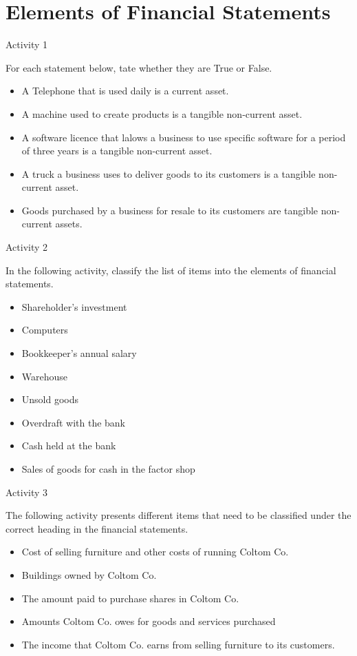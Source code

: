 \section{Elements of Financial Statements} 

Activity 1 

For each statement below, tate whether they are True or False. 

\begin{itemize}
    \item A Telephone that is used daily is a current asset.
    \item A machine used to create products is a tangible non-current asset. 
    \item A software licence that lalows a business to use specific software for a period of three years is a tangible non-current asset. 
    \item A truck a business uses to deliver goods to its customers is a tangible non-current asset. 
    \item Goods purchased by a business for resale to its customers are tangible non-current assets. 
\end{itemize}       

Activity 2 

In the following activity, classify the list of items into the elements of financial statements. 

\begin{itemize} 
    \item Shareholder's investment
    \item Computers 
    \item Bookkeeper's annual salary
    \item Warehouse 
    \item Unsold goods
    \item Overdraft with the bank
    \item Cash held at the bank
    \item Sales of goods for cash in the factor shop
\end{itemize} 

Activity 3 

The following activity presents different items that need to be classified under the correct heading in the financial statements. 

\begin{itemize} 
    \item Cost of selling furniture and other costs of running Coltom Co. 
    \item Buildings owned by Coltom Co. 
    \item The amount paid to purchase shares in Coltom Co. 
    \item Amounts Coltom Co. owes for goods and services purchased
    \item The income that Coltom Co. earns from selling furniture to its customers. 
\end{itemize} 


